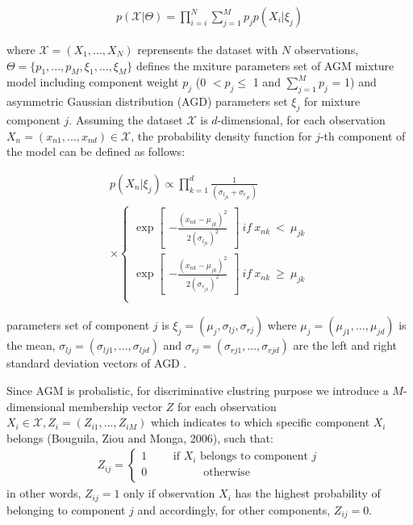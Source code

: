 \documentclass[conference]{IEEEtran}
\begin{document}
\begin{align}
p(\mathcal{X}|\Theta) = \prod_{i=i}^N \sum_{j=1}^Mp_jp(X_i|\xi_j)
\label{eq:likelihood}
\end{align}

where $\mathcal{X} = (X_1,...,X_N)$ reprensents the dataset with $N$ observations, $\Theta = \{p_1,...,p_M, \xi_1,...,\xi_M\}$ defines the mxiture parameters set of AGM mixture model including component weight $p_j$ (0 $< p_j \leq$ 1 and $\sum_{j=1}^Mp_j$ = 1) and asymmetric Gaussian distribution (AGD) parameters set $\xi_j$ for mixture component $j$. Assuming the dataset $\mathcal{X}$ is $d$-dimensional, for each observation $X_n = (x_{n1},...,x_{nd})\in\mathcal{X}$, the probability density function\cite{b2} for $j$-th component of the model can be defined as follows:

\begin{multline}
p(X_n|\xi_j) \propto \prod_{k=1}^{d} \frac{1}{(\sigma_{l_{jk}}+\sigma_{r_{jk}})} \\
\times \left\{\begin{matrix}
\exp \begin{bmatrix}
-\frac{(x_{nk}-\mu_{jk})^2}{2(\sigma_{l_{jk}})^2}
\end{bmatrix}\ if\ x_{nk}\ <\ \mu_{jk} \\ 
\exp \begin{bmatrix}
-\frac{(x_{nk}-\mu_{jk})^2}{2(\sigma_{r_{jk}})^2}
\end{bmatrix}\ if\ x_{nk}\ \geqslant\ \mu_{jk} \\ 
\end{matrix}\right.
\label{eq:pdf}
\end{multline}

parameters set of component $j$ is $\xi_j = (\mu_j,\sigma_{lj},\sigma_{rj})$ where $\mu_j = (\mu_{j1},...,\mu_{jd})$ is the mean, $\sigma_{lj} = (\sigma_{lj1},...,\sigma_{ljd})$ and $\sigma_{rj} = (\sigma_{rj1},...,\sigma_{rjd})$ are the left and right standard deviation vectors of AGD . 

Since AGM is probalistic, for discriminative clustring purpose we introduce a $M$-dimensional membership vector $Z$ for each observation $X_i\in\mathcal{X}, Z_i = (Z_{i1},...,Z_{iM})$ which indicates to which specific component $X_i$ belongs (Bouguila, Ziou and Monga, 2006)\cite{b8}, such that:
\begin{align}
Z_{ij} = \left\{\begin{matrix}
1\qquad\mbox{ if }X_i\mbox{  belongs to component }j \\
0\qquad\quad\qquad \mbox{otherwise} \qquad\qquad\quad\quad \\
\end{matrix}\right.
\label{eq:memVector}
\end{align}
in other words, $Z_{ij} = 1$ only if observation $X_i$ has the highest probability of belonging to component $j$ and accordingly, for other components, $Z_{ij} = 0$. 
\end{document}
